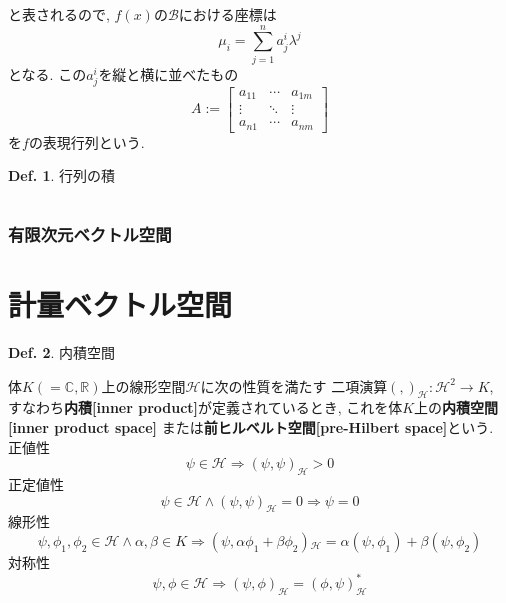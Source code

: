 \documentclass[a4paper,10pt,report]{amsart}
\theoremstyle{plain}
\theoremstyle{definition}
\newtheorem{defn}{Def.}[section]
\theoremstyle{remark}
\begin{document}
と表されるので, \(f(x)\)の\(\mathcal{B}\)における座標は
\begin{equation}
    \mu_{i}=\sum_{j=1}^{n}a_{j}^{i}\lambda^{j}
\end{equation}
となる. 
この\(a^{i}_{j}\)を縦と横に並べたもの
\begin{equation}
    A:=
    \begin{bmatrix}
    a_{11} & \cdots & a_{1m} \\ 
    \vdots & \ddots & \vdots \\ 
    a_{n1} & \cdots & a_{nm}
    \end{bmatrix}
\end{equation}
を\(f\)の表現行列という.
\begin{leftbar}
    \begin{defn}行列の積\par
        \(\)
    \end{defn}
\end{leftbar}
\section{有限次元ベクトル空間}
\part{計量ベクトル空間}
\begin{leftbar}
    \begin{defn}内積空間\par
        体\(K(=\mathbb{C},\mathbb{R})\)上の線形空間\(\mathcal{H}\)に次の性質を満たす
        二項演算\({(,)}_{\mathcal{H}}:\mathcal{H}^{2}\to K\), 
        すなわち\textbf{内積[inner product]}が定義されているとき, 
        これを体\(K\)上の\textbf{内積空間[inner product space]}
        または\textbf{前ヒルベルト空間[pre-Hilbert space]}という. \\
        正値性
        \begin{equation}
           \psi\in\mathcal{H}\Rightarrow {(\psi,\psi)}_{\mathcal{H}}>0
        \end{equation}
        正定値性
        \begin{equation}
            \psi\in\mathcal{H}\wedge{(\psi,\psi)}_{\mathcal{H}}=0\Rightarrow\psi=0
        \end{equation}
        線形性
        \begin{equation}
            \psi,\phi_{1},\phi_{2}\in\mathcal{H}\wedge\alpha,\beta\in K\Rightarrow(\psi,\alpha\phi_{1}+\beta\phi_{2}){}_{\mathcal{H}}
            =\alpha(\psi,\phi_{1})+\beta(\psi,\phi_{2})
        \end{equation}
        対称性
        \begin{equation}
            \psi,\phi\in\mathcal{H}\Rightarrow{(\psi,\phi)}_{\mathcal{H}}={(\phi,\psi)}_{\mathcal{H}}^{*}
        \end{equation}
    \end{defn}
\end{leftbar}
\end{document}
